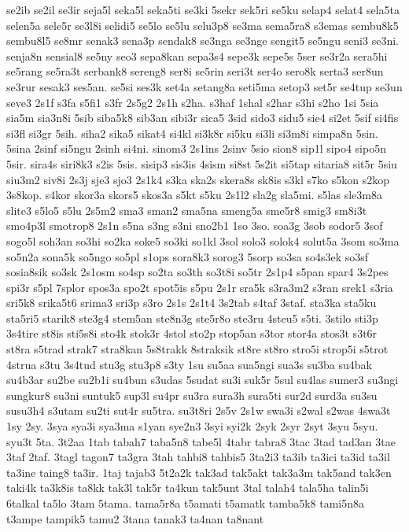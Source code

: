 {se2ib se2il se3ir seja5l seka5l seka5ti se3ki 5sekr sek5ri se5ku selap4
selat4 sela5ta selen5a sele5r se3l8i selidi5 se5lo se5lu selu3p8 se3ma
sema5ra8 s3emas sembu8k5 sembu8l5 se8mr senak3 sena3p sendak8 se3nga
se3nge sengit5 se5ngu seni3 se3ni. senja8n sensial8 se5ny seo3 sepa8kan
sepa3s4 sepe3k sepe5s 5ser se3r2a sera5hi se5rang se5ra3t serbank8 sereng8
ser8i se5rin seri3t ser4o sero8k serta3 ser8un se3rur sesak3 ses5an. se5si
ses3k set4a setang8a seti5ma setop3 set5r se4tup se3un seve3 2s1f s3fa
s5fi1 s3fr 2s5g2 2s1h s2ha. s3haf 1shal s2har s3hi s2ho 1si 5sia sia5m
sia3n8i 5sib siba5k8 sib3an sibi3r sica5 3sid sido3 sidu5 sie4 si2et 5sif
si4fis si3fl si3gr 5sih. siha2 sika5 sikat4 si4kl si3k8r si5ku si3li
si3m8i simpa8n 5sin. 5sina 2sinf si5ngu 2sinh si4ni. sinom3 2s1ins 2sinv
5sio sion8 sip1l sipo4 sipo5n 5sir. sira4s siri8k3 s2is 5sis. sisip3
sis3is 4sism si8st 5s2it si5tap sitaria8 sit5r 5siu siu3m2 siv8i 2s3j sje3
sjo3 2s1k4 s3ka ska2s skera8s sk8is s3kl s7ko s5kon s2kop 3s8kop. s4kor
skor3a skors5 skos3a s5kt s5ku 2s1l2 sla2g sla5mi. s5las sle3m8a slite3
s5lo5 s5lu 2s5m2 sma3 sman2 sma5na smeng5a sme5r8 smig3 sm8i3t smo4p3l
smotrop8 2s1n s5na s3ng s3ni sno2b1 1so 3so. soa3g 3sob sodor5 3sof sogo5l
soh3an so3hi so2ka soke5 so3ki so1kl 3sol solo3 solok4 solut5a 3som so3ma
so5n2a sona5k so5ngo so5pl s1ops sora8k3 sorog3 5sorp so3sa so4s3ek so3sf
sosia8sik so3sk 2s1osm so4sp so2ta so3th so3t8i so5tr 2s1p4 s5pan spar4
3s2pes spi3r s5pl 7splor spos3a spo2t spot5is s5pu 2s1r sra5k s3ra3m2
s3ran srek1 s3ria sri5k8 srika5t6 srima3 sri3p s3ro 2s1s 2s1t4 3s2tab
s4taf 3staf. sta3ka sta5ku sta5ri5 starik8 ste3g4 stem5an ste8n3g ste5r8o
ste3ru 4steu5 s5ti. 3stilo sti3p 3s4tire st8is sti5s8i sto4k stok3r 4stol
sto2p stop5an s3tor stor4a stos3t s3t6r st8ra s5trad strak7 stra8kan
5s8trakk 8straksik st8re st8ro stro5i strop5i s5trot 4strua s3tu 3s4tud
stu3g stu3p8 s3ty 1su su5aa sua5ngi sua3s su3ba su4bak su4b3ar su2be
su2b1i su4bun s3udas 5sudat su3i suk5r 5sul su4las sumer3 su3ngi sungkur8
su3ni suntuk5 sup3l su4pr su3ra sura3h sura5ti sur2d surd3a su3su susu3h4
s3utam su2ti sut4r su5tra. su3t8ri 2s5v 2s1w swa3i s2wal s2was 4swa3t 1sy
2sy. 3sya sya3i sya3ma s1yan sye2n3 3syi syi2k 2syk 2syr 2syt 3syu 5syu.
syu3t 5ta. 3t2aa 1tab tabah7 taba5n8 tabe5l 4tabr tabra8 3tac 3tad tad3an
3tae 3taf 2taf. 3tagl tagon7 ta3gra 3tah tahbi8 tahbis5 3ta2i3 ta3ib
ta3ici ta3id ta3il ta3ine taing8 ta3ir. 1taj tajab3 5t2a2k tak3ad tak5akt
tak3a3m tak5and tak3en taki4k ta3k8is ta8kk tak3l tak5r ta4kun tak5unt
3tal talah4 tala5ha talin5i 6talkal ta5lo 3tam 5tama. tama5r8a t5amati
t5amatk tamba5k8 tami5n8a t3ampe tampik5 tamu2 3tana tanak3 ta4nan ta8nant
}
